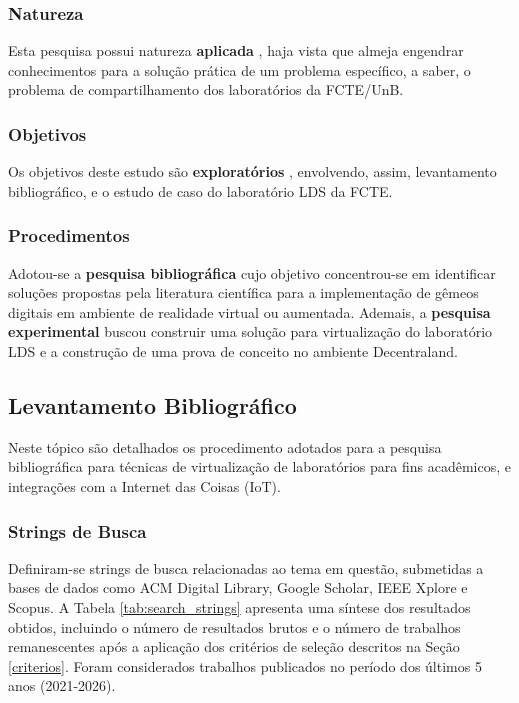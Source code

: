 \documentclass[12pt]{article}
\begin{document}
\subsubsection{Natureza}

Esta pesquisa possui natureza \textbf{aplicada} \cite[p. ~36-37]{gerhardt_silveira}, haja vista que almeja engendrar conhecimentos para a solução prática de um problema específico, a saber, o problema de compartilhamento dos laboratórios da FCTE/UnB.

\subsubsection{Objetivos}

Os objetivos deste estudo são \textbf{exploratórios} \cite[p.~37-38]{gerhardt_silveira}, envolvendo, assim, levantamento bibliográfico, e o estudo de caso do laboratório LDS da FCTE.

\subsubsection{Procedimentos}

Adotou-se a \textbf{pesquisa bibliográfica} \cite[p.~39]{gerhardt_silveira} cujo objetivo concentrou-se em identificar soluções propostas pela literatura científica para a implementação de gêmeos digitais em ambiente de realidade virtual ou aumentada. Ademais, a \textbf{pesquisa experimental} \cite[p.~38]{gerhardt_silveira} buscou construir uma solução para virtualização do laboratório LDS e a construção de uma prova de conceito no ambiente Decentraland.

\subsection{Levantamento Bibliográfico}
\label{levantamento}

Neste tópico são detalhados os procedimento adotados para a pesquisa bibliográfica para técnicas de virtualização de laboratórios para fins acadêmicos, e integrações com a Internet das Coisas (IoT).

\subsubsection{Strings de Busca}

Definiram-se strings de busca relacionadas ao tema em questão, submetidas a bases de dados como ACM Digital Library, Google Scholar, IEEE Xplore e Scopus. A Tabela \ref{tab:search_strings} apresenta uma síntese dos resultados obtidos, incluindo o número de resultados brutos e o número de trabalhos remanescentes após a aplicação dos critérios de seleção descritos na Seção \ref{criterios}. Foram considerados trabalhos publicados no período dos últimos 5 anos (2021-2026).
\end{document}
